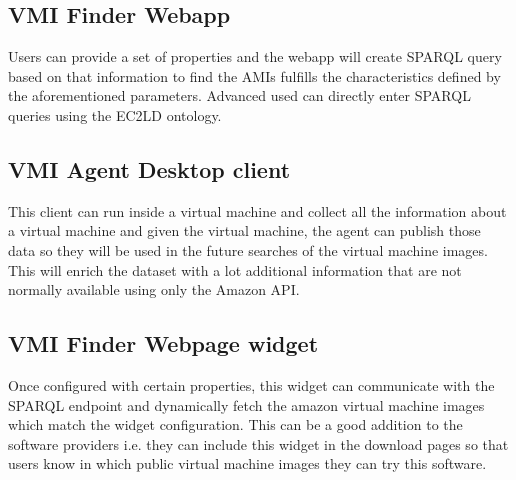 \subsection{VMI Finder Webapp}
Users can provide a set of properties and the webapp will create SPARQL query based on that information to find the AMIs fulfills the characteristics defined by the aforementioned parameters. Advanced used can directly enter SPARQL queries using the EC2LD ontology.

\subsection{VMI Agent Desktop client}
This client can run inside a virtual machine and collect all the information about a virtual machine and given the virtual machine, the agent can publish those data so they will be used in the future searches of the virtual machine images. This will enrich the dataset with a lot additional information that are not normally available using only the Amazon API.

\subsection{VMI Finder Webpage widget}
Once configured with certain properties, this widget can communicate with the SPARQL endpoint and dynamically fetch the amazon virtual machine images which match the widget configuration. This can be a good addition to the software providers i.e. they can include this widget in the download pages so that users know in which public virtual machine images they can try this software.
